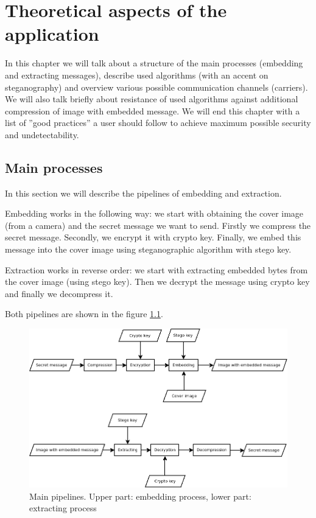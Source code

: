 \chapter{Theoretical aspects of the application}
In this chapter we will talk about a structure of the main
processes (embedding and extracting messages),
describe used algorithms (with an accent on steganography) and 
overview various possible communication channels (carriers).
We will also talk briefly about resistance of used algorithms
against additional compression of image with embedded message.
We will end this chapter with a list of ''good practices''
a user should follow to achieve maximum possible security
and undetectability.


\section{Main processes}
In this section we will describe
the pipelines of embedding and extraction. 

Embedding works in the following way: we start with obtaining the cover image
(from a camera) and the secret message we want to send. Firstly we compress 
the secret message. Secondly, we encrypt it with crypto key. Finally, we embed
this message into the cover image using steganographic algorithm with stego key.

Extraction works in reverse order: we start with extracting embedded bytes from
the cover image (using stego key). Then we decrypt the message using crypto key
and finally we decompress it. 

Both pipelines are shown in the figure \ref{img:CSflow}.

\begin{figure}
\centerline{\includegraphics[width=\textwidth]{diagrams/flow.png}}
\caption[Main pipelines]{Main pipelines. Upper part: embedding process, lower part: extracting process}
\label{img:CSflow}
\end{figure}


